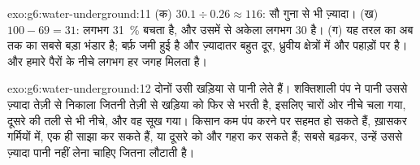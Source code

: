 \begin{solution}{exo:g6:water-underground:11}
(क) $30.1 \div 0.26 \approx 116$: सौ गुना से भी ज़्यादा।
(ख) $100 - 69 = 31$: लगभग 31~\% बचता है, और उसमें से अकेला  लगभग 30 है।
(ग) यह तरल  का अब तक का सबसे बड़ा भंडार है; बर्फ़ जमी हुई है और
ज़्यादातर बहुत दूर, ध्रुवीय क्षेत्रों में और पहाड़ों पर है। और  हमारे
पैरों के नीचे लगभग हर जगह मिलता है।
\end{solution}

\begin{solution}{exo:g6:water-underground:12}
दोनों  उसी खड़िया  से पानी लेते हैं। शक्तिशाली पंप ने पानी उससे ज़्यादा
तेज़ी से निकाला जितनी तेज़ी से  खड़िया को फिर से भरती है, इसलिए चारों ओर  नीचे चला गया, दूसरे  की तली से भी नीचे, और वह  सूख गया। किसान
कम पंप करने पर सहमत हो सकते हैं, ख़ासकर गर्मियों में, एक ही  साझा कर सकते
हैं, या दूसरे  को और गहरा कर सकते हैं; सबसे बढ़कर, उन्हें उससे ज़्यादा पानी
नहीं लेना चाहिए जितना  लौटाती है।
\end{solution}

